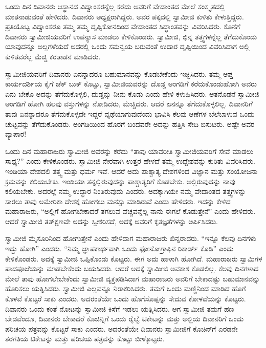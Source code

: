  ಒಂದು ದಿನ ದಿವಾನರು ಆಸ್ಥಾನದ ವಿದ್ವಾಂಸರನ್ನೆಲ್ಲ ಕರೆದು ಅವರಿಗೆ ವೇದಾಂತದ ಮೇಲೆ ಸಂಸ್ಕೃತದಲ್ಲಿ ಮಾತನಾಡುವಂತೆ ಹೇಳಿದರು. ದಿವಾನರು ಅಧ್ಯಕ್ಷರಾಗಿದ್ದರು. ಅವರ ಪಕ್ಕದಲ್ಲಿ ಸ್ವಾಮೀಜಿ ಕುಳಿತು ಕೇಳುತ್ತಿದ್ದರು. ಪ್ರತಿಯೊಬ್ಬ ವಿದ್ವಾಂಸರೂ ತಮ್ಮ ತಮ್ಮ ದೃಷ್ಟಿಕೋನದಿಂದ ವೇದಾಂತದ ಸಿದ್ಧಾಂತವನ್ನು ವಿವರಿಸಿದರು. ಕೊನೆಗೆ ದಿವಾನರು ಸ್ವಾಮೀಜಿಯವರಿಗೆ ಉಪನ್ಯಾಸ ಮಾಡಲು ಕೇಳಿಕೊಂಡರು. ಸ್ವಾಮೀಜಿ, ಭಿನ್ನ ತತ್ತ್ವಗಳನ್ನೆಲ್ಲ ತೆಗೆದುಕೊಂಡು ಯಾವುದನ್ನೂ ಅಲ್ಲಗಳೆಯದೆ ಅದರಲ್ಲಿ ಒಂದು ಸಮನ್ವಯ ಬರುವಂತೆ ಉದಾರ ದೃಷ್ಟಿಯಿಂದ ವಿವರಿಸಿದಾಗ ಅಲ್ಲಿ ಕುಳಿತವರೆಲ್ಲ ಮೆಚ್ಚಿ ಕರತಾಡನ ಮಾಡಿದರು. 

 ಸ್ವಾಮೀಜಿಯವರಿಗೆ ದಿವಾನರು ಏನನ್ನಾದರೂ ಬಹುಮಾನವನ್ನು ಕೊಡಬೇಕೆಂದು ಇಚ್ಛಿಸಿದರು. ತಮ್ಮ ಆಪ್ತ ಕಾರ್ಯದರ್ಶಿಯ ಕೈಗೆ ಚೆಕ್ ಬುಕ್ ಕೊಟ್ಟು, ಸ್ವಾಮೀಜಿಯವರನ್ನು ದೊಡ್ಡ ಅಂಗಡಿಗೆ ಕರೆದುಕೊಂಡುಹೋಗಿ ಅವರು ಏನು ಬೇಕೊ ಅದನ್ನು ತೆಗೆದುಕೊಳ್ಳಲಿ, ದುಡ್ಡನ್ನು ನೀನು ಕೊಡು ಎಂದು ಹೇಳಿ ಕಳುಹಿಸಿದರು. ಆತನೊಡನೆ ಸ್ವಾಮೀಜಿ ಅಂಗಡಿಗೆ ಹೋಗಿ ಹಲವು ವಸ್ತುಗಳನ್ನು ನೋಡಿದರು, ಮೆಚ್ಚಿದರು. ಆದರೆ ಏನನ್ನೂ ತೆಗೆದುಕೊಳ್ಳಲಿಲ್ಲ. ದಿವಾನರಿಗೆ ತಾವು ಏನನ್ನಾದರೂ ತೆಗೆದುಕೊಳ್ಳದೇ ಇದ್ದರೆ ವ್ಯಥೆಯಾಗುವುದೆಂದು ಭಾವಿಸಿ ಕೆಲವು ಆಣೆಗಳ ಬೆಲೆಬಾಳುವ ಒಂದು ಚುಟ್ಟವನ್ನು ತೆಗೆದುಕೊಂಡರು. ಅಂಗಡಿಯಿಂದ ಹೊರಗೆ ಬಂದವರೇ ಅದನ್ನು ಹತ್ತಿಸಿ ಸೇದಿ ಬಿಸುಟರು. ಅಷ್ಟೇ ಅವರ ವ್ಯಾಪಾರ! 

 ಒಂದು ದಿನ ಮಹಾರಾಜರು ಸ್ವಾಮೀಜಿ ಅವರನ್ನು ಕರೆದು “ತಾವು ಯಾವರೀತಿ ಸ್ವಾಮೀಜಿಯವರಿಗೆ ಸೇವೆ ಮಾಡಲು ಸಾಧ್ಯ?” ಎಂದು ಕೇಳಿಕೊಂಡರು. ಸ್ವಾಮೀಜಿ ನೇರವಾಗಿ ಉತ್ತರ ಹೇಳದೆ ತಮ್ಮ ಉದ್ದೇಶವನ್ನು ಕುರಿತು ವಿವರಿಸಿದರು. ಇಂಡಿಯಾ ದೇಶದಲಿ ತತ್ತ್ವ ಮತ್ತು ಧರ್ಮ ಇವೆ. ಆದರೆ ಅದು ಪಾಶ್ಚಾತ್ಯ ದೇಶಗಳಿಂದ ವಿಜ್ಞಾನ ಮತ್ತು ಸಂಯೋಜನಾ ಕ್ರಮವನ್ನು ಕಲಿಯಬೇಕು. ಇಂಡಿಯಾ ತನ್ನಲ್ಲಿರುವುದನ್ನು ಪಾಶ್ಚಾತ್ಯರಿಗೆ ಕೊಡಬೇಕು. ಅಲ್ಲಿರುವುದನ್ನು ನಾವು ಕಲಿಯಬೇಕು. ಅದರಲ್ಲೆ ನಮ್ಮ ಉದ್ಧಾರ ನಿಂತಿರುವುದು ಎಂದರು. ಅದಕ್ಕಾಗಿಯೇ ನಮ್ಮ ವೇದಾಂತದ ತತ್ತ್ವಗಳನ್ನು ಸಾರಲು ತಾವು ಅಮೇರಿಕಾ ದೇಶಕ್ಕೆ ಹೋಗಲು ಮನಸ್ಸು ಮಾಡಿರುವೆ ಎಂದು ಹೇಳಿದರು. ಇದನ್ನು ಕೇಳಿದ ಮಹಾರಾಜರು, “ಅಲ್ಲಿಗೆ ಹೋಗಬೇಕಾದರೆ ತಗಲುವ ವೆಚ್ಚವನ್ನೆಲ್ಲ ನಾನು ಈಗಲೆ ಕೊಡುತ್ತೇನೆ” ಎಂದು ಹೇಳಿದರು. ಆದರೆ ಸ್ವಾಮೀಜಿ ತತ್‍ಕ್ಷಣವೇ ಅದನ್ನು ಸ್ವೀಕರಿಸದೆ, ಅದಕ್ಕೆ ಅವರಿಗೆ ಕೃತಜ್ಞತೆಗಳನ್ನು ಅರ್ಪಿಸಿದರು. 

 ಸ್ವಾಮೀಜಿ ಮೈಸೂರಿನಿಂದ ಹೋಗುತ್ತೇನೆ ಎಂದು ಹೇಳಿದಾಗ ಮಹಾರಾಜರು ಖಿನ್ನರಾದರು. “ಇನ್ನೂ ಕೆಲವು ದಿನಗಳು ಇದ್ದು ಹೋಗಿ” ಎಂದರು. “ನಿಮ್ಮ ಜ್ಞಾಪಕಾರ್ಥವಾಗಿ ಒಂದು ಫೋನೋಗ್ರಾಫಿನ ರಿಕಾರ್ಡ್ ಕೊಡಿ” ಎಂದು ಕೇಳಿಕೊಂಡರು. ಅದಕ್ಕೆ ಸ್ವಾಮೀಜಿ ಒಪ್ಪಿಕೊಂಡು ಕೊಟ್ಟರು. ಈಗ ಅದು ಹಾಳಾಗಿ ಹೋಗಿದೆ. ಮಹಾರಾಜರು ಸ್ವಾಮಿಗಳ ಪಾದಪೂಜೆಯನ್ನು ಮಾಡಬೇಕೆಂದು ಬಯಸಿದರು. ಆದರೆ ಅದಕ್ಕೆ ಸ್ವಾಮೀಜಿ ಅವಕಾಶ ಕೊಡಲಿಲ್ಲ. ಕೆಲವು ದಿನಗಳಾದ ಮೇಲೆ ತಾವು ಹೋಗಲೇಬೇಕೆಂದು ಸ್ವಾಮೀಜಿ ವ್ಯಕ್ತಪಡಿಸಿದಾಗ ಮಹಾರಾಜರು ಅವರಿಗೆ ಬೇಕಾದಷ್ಟು ಬಹುಮಾನವನ್ನು ಹೊರಿಸಲು ಯತ್ನಿಸಿದರು. ಸ್ವಾಮೀಜಿ ಎಲ್ಲವನ್ನೂ ನಿರಾಕರಿಸಿದರು. ತಮಗೆ ಒಂದು ಮಣ್ಣಿನಿಂದ ಮಾಡಿದ ಹೊಗೆ ಕೊಳವೆ ಕೊಟ್ಟರೆ ಸಾಕು ಎಂದರು. ಅದರಂತೆಯೇ ಒಂದು ಹೊಗೆಸೊಪ್ಪನ್ನು ಸೇದುವ ಕೋಳವೆಯನ್ನು ಕೊಟ್ಟರು. ದಿವಾನರು ಒಂದು ಕಂತೆ ನೋಟನ್ನು ಸ್ವಾಮೀಜಿ ಕಿಸೆಗೆ ಇಡಲು ಯತ್ನಿಸಿದರು. ಆಗ ಸ್ವಾಮೀಜಿ ತಮಗೆ ಹಣ ಬೇಡವೆಂದೂ, ದಿವಾನರು ಬೇಕಾದರೆ ಕೊಚಿನ್ನಿಗೆ ಒಂದು ರೈಲ್ವೆ ಟಿಕೇಟನ್ನು ಮತ್ತು ಅಲ್ಲಿಯ ದಿವಾನರಿಗೆ ಒಂದು ಪರಿಚಯ ಪತ್ರವನ್ನು ಕೊಟ್ಟರೆ ಸಾಕು ಎಂದರು. ಅದರಂತೆಯೇ ದಿವಾನರು ಸ್ವಾಮೀಜಿಗೆ ಕೊಚಿನ್‍ಗೆ ಎರಡನೇ ತರಗತಿಯ ಟಿಕೇಟನ್ನು ಮತ್ತು ಪರಿಚಯ ಪತ್ರವನ್ನು ಕೊಟ್ಟು ಬೀಳ್ಕೊಟ್ಟರು. 

